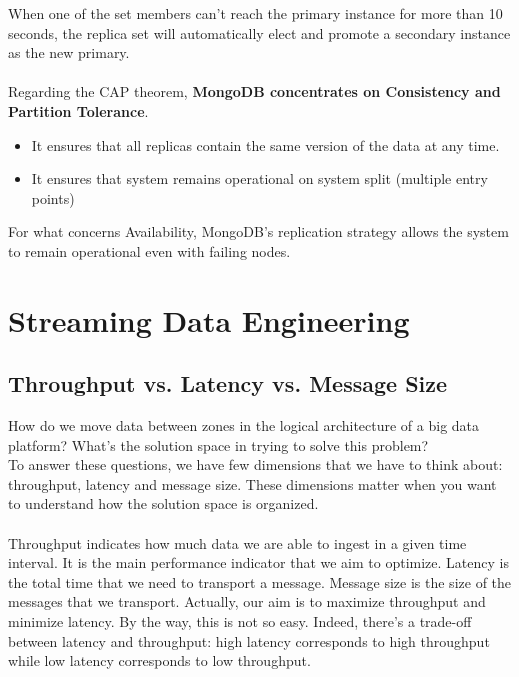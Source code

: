 \documentclass[10pt,a4paper]{article}
\newcommand{\nline}{\\~\\}
\begin{document}
When one of the set members can’t reach the primary instance for more than 10 seconds, the replica set will automatically elect and promote a secondary instance as the new primary.
\nline
Regarding the CAP theorem, \textbf{MongoDB concentrates on Consistency and Partition Tolerance}. 
\begin{itemize}
	\item It ensures that all replicas contain the same version of the data at any time.
	\item It ensures that system remains operational on system split (multiple entry points)
\end{itemize}
For what concerns Availability, MongoDB’s replication strategy allows the system to remain operational even with failing nodes.

\pagebreak

\section{Streaming Data Engineering}
\subsection{Throughput vs. Latency vs. Message Size}
How do we move data between zones in the logical architecture of a big data platform? What’s the solution space in trying to solve this problem?
\\
To answer these questions, we have few dimensions that we have to think about: throughput, latency and message size. These dimensions matter when you want to understand how the solution space is organized.
\nline
Throughput indicates how much data we are able to ingest in a given time interval. It is the main performance indicator that we aim to optimize. Latency is the total time that we need to transport a message. Message size is the size of the messages that we transport. 
Actually, our aim is to maximize throughput and minimize latency. By the way, this is not so easy. Indeed, there’s a trade-off between latency and throughput: high latency corresponds to high throughput while low latency corresponds to low throughput. 
\end{document}
